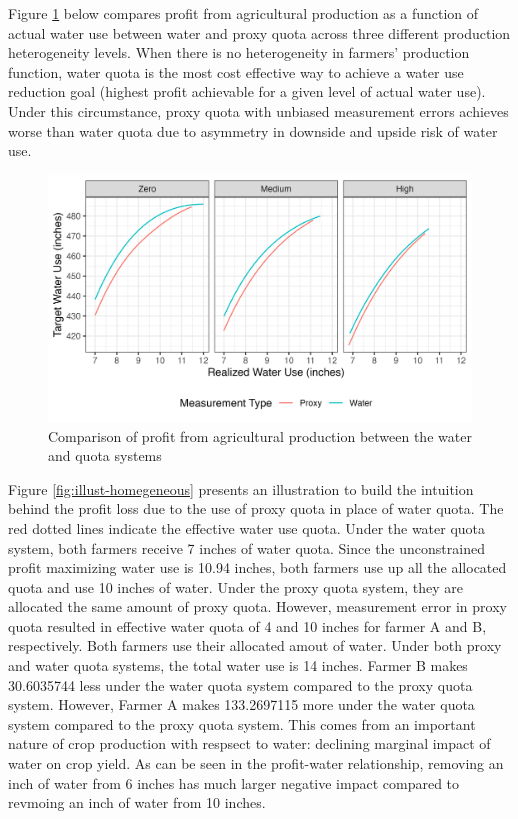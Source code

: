 \documentclass[
]{article}
\begin{document}
Figure \ref{fig:profit-quota-water-het} below compares profit from agricultural production as a function of actual water use between water and proxy quota across three different production heterogeneity levels. When there is no heterogeneity in farmers' production function, water quota is the most cost effective way to achieve a water use reduction goal (highest profit achievable for a given level of actual water use). Under this circumstance, proxy quota with unbiased measurement errors achieves worse than water quota due to asymmetry in downside and upside risk of water use.

\begin{figure}[H]

{\centering \includegraphics{figures/g_profit_quota_w_vs_p} 

}

\caption{Comparison of profit from agricultural production between the water and quota systems}\label{fig:profit-quota-water-het}
\end{figure}

Figure \ref{fig:illust-homegeneous} presents an illustration to build the intuition behind the profit loss due to the use of proxy quota in place of water quota. The red dotted lines indicate the effective water use quota. Under the water quota system, both farmers receive 7 inches of water quota. Since the unconstrained profit maximizing water use is 10.94 inches, both farmers use up all the allocated quota and use 10 inches of water. Under the proxy quota system, they are allocated the same amount of proxy quota. However, measurement error in proxy quota resulted in effective water quota of 4 and 10 inches for farmer A and B, respectively. Both farmers use their allocated amout of water. Under both proxy and water quota systems, the total water use is 14 inches. Farmer B makes 30.6035744 less under the water quota system compared to the proxy quota system. However, Farmer A makes 133.2697115 more under the water quota system compared to the proxy quota system. This comes from an important nature of crop production with respsect to water: declining marginal impact of water on crop yield. As can be seen in the profit-water relationship, removing an inch of water from 6 inches has much larger negative impact compared to revmoing an inch of water from 10 inches.
\end{document}
